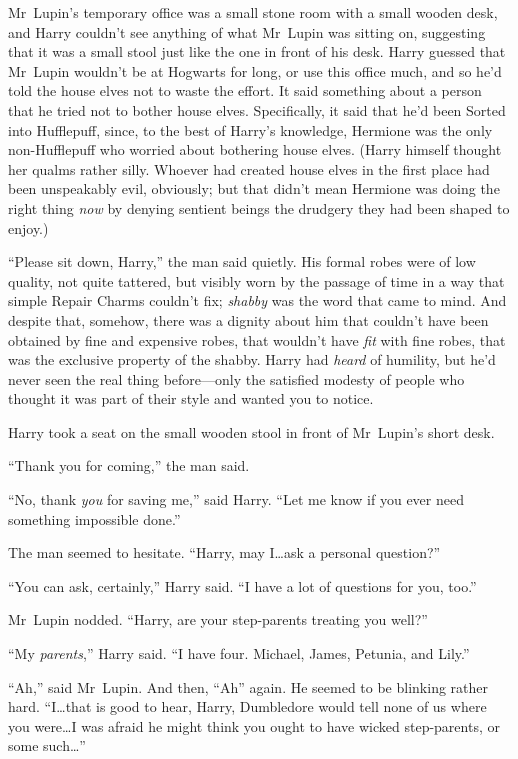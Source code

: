 \later

Mr~Lupin’s temporary office was a small stone room with a small wooden desk, and Harry couldn’t see anything of what Mr~Lupin was sitting on, suggesting that it was a small stool just like the one in front of his desk. Harry guessed that Mr~Lupin wouldn’t be at Hogwarts for long, or use this office much, and so he’d told the house elves not to waste the effort. It said something about a person that he tried not to bother house elves. Specifically, it said that he’d been Sorted into Hufflepuff, since, to the best of Harry’s knowledge, Hermione was the only non-Hufflepuff who worried about bothering house elves. (Harry himself thought her qualms rather silly. Whoever had created house elves in the first place had been unspeakably evil, obviously; but that didn’t mean Hermione was doing the right thing \emph{now} by denying sentient beings the drudgery they had been shaped to enjoy.)

“Please sit down, Harry,” the man said quietly. His formal robes were of low quality, not quite tattered, but visibly worn by the passage of time in a way that simple Repair Charms couldn’t fix; \emph{shabby} was the word that came to mind. And despite that, somehow, there was a dignity about him that couldn’t have been obtained by fine and expensive robes, that wouldn’t have \emph{fit} with fine robes, that was the exclusive property of the shabby. Harry had \emph{heard} of humility, but he’d never seen the real thing before—only the satisfied modesty of people who thought it was part of their style and wanted you to notice.

Harry took a seat on the small wooden stool in front of Mr~Lupin’s short desk.

“Thank you for coming,” the man said.

“No, thank \emph{you} for saving me,” said Harry.
“Let me know if you ever need something impossible done.”

The man seemed to hesitate.
“Harry, may I…ask a personal question?”

“You can ask, certainly,” Harry said.
“I have a lot of questions for you, too.”

Mr~Lupin nodded.
“Harry, are your step-parents treating you well?”

“My \emph{parents},” Harry said.
“I have four. Michael, James, Petunia, and Lily.”

“Ah,” said Mr~Lupin. And then,
“Ah” again. He seemed to be blinking rather hard.
“I…that is good to hear, Harry, Dumbledore would tell none of us where you were…I was afraid he might think you ought to have wicked step-parents, or some such…”

